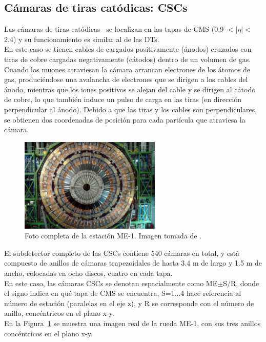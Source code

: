 \subsection{C\'amaras de tiras cat\'odicas: CSCs}\label{sec:CSCs}

Las c\'amaras de tiras cat\'odicas~\cite{CSCperformance} se localizan en las tapas de CMS (0.9 $< \lvert \eta \rvert <$ 2.4) y su funcionamiento es similar al de las DTs. \\
En este caso se tienen cables de cargados positivamente (\'anodos) cruzados con tiras de cobre cargadas negativamente (c\'atodos) dentro de un volumen de gas. Cuando los muones atraviesan la c\'amara arrancan electrones de los \'atomos de gas, produci\'endose una avalancha de electrones que se dirigen a los cables del \'anodo, mientras que los iones positivos se alejan del cable y se dirigen al c\'atodo de cobre, lo que tambi\'en induce un pulso de carga en las tiras (en direcci\'on perpendicular al \'anodo). Debido a que las tiras y los cables son perpendiculares, se obtienen dos coordenadas de posici\'on para cada part\'icula que atraviesa la c\'amara. \\

\begin{figure}[h]
\centering
\includegraphics[width=0.60\textwidth]{figures/CSC_MEm1.jpg}
\caption{Foto completa de la estaci\'on ME-1. Imagen tomada de \cite{Breedon:1431505}.}
\label{fig:CSC_MEm1}        
\end{figure}


El subdetector completo de las CSCs contiene 540 c\'amaras en total, y est\'a compuesto de anillos de c\'amaras trapezoidales de hasta 3.4 m de largo y 1.5 m de ancho, colocadas en ocho discos, cuatro en cada tapa. \\
En este caso, las c\'amaras CSCs se denotan espacialmente como ME$\pm$S/R, donde el signo indica en qu\'e tapa de CMS se encuentra, S=1...4 hace referencia al n\'umero de estaci\'on (paralelas en el eje z), y R se corresponde con el n\'umero de anillo, conc\'entricos en el plano x-y. \\
En la Figura~\ref{fig:CSC_MEm1} se muestra una imagen real de la rueda ME-1, con sus tres anillos conc\'entricos en el plano x-y. \\ 

